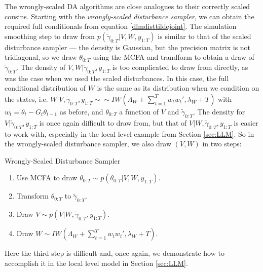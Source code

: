 \documentclass{article}
\begin{document}
The wrongly-scaled DA algorithms are close analogues to their correctly scaled cousins. Starting with the {\it wrongly-scaled disturbance sampler}, we can obtain the required full conditionals from equation \eqref{dlmdisttildejoint}. The simulation smoothing step to draw from $p(\tilde{\gamma}_{0:T}|V,W,y_{1:T})$ is similar to that of the scaled disturbance sampler --- the density is Gaussian, but the precision matrix is not tridiagonal, so we draw $\theta_{0:T}$ using the MCFA and trandform to obtain a draw of $\tilde{\gamma}_{0:T}$. The density of $V,W|\tilde{\gamma}_{0:T},y_{1:T}$ is too complicated to draw from directly, as was the case when we used the scaled disturbances. In this case, the full conditional distribution of $W$ is the same as its distribution when we condition on the states, i.e. $W|V,\tilde{\gamma}_{0:T},y_{1:T} \sim \sim IW\left(\Lambda_W + \sum_{t=1}^Tw_tw_t',\lambda_{W} + T\right)$ with $w_t = \theta_t - G_t\theta_{t-1}$ as before, and $\theta_{0:T}$ a function of $V$ and $\tilde{\gamma}_{0:T}$. The density for $V|\tilde{\gamma}_{0:T},y_{1:T}$ is once again difficult to draw from, but that of $V|W,\tilde{\gamma}_{0:T},y_{1:T}$ is easier to work with, especially in the local level example from Section \ref{sec:LLM}. So in the wrongly-scaled disturbance sampler, we also draw $(V,W)$ in two steps: 
\begin{alg*}[W-Dist]Wrongly-Scaled Disturbance Sampler\label{alg:DLMwdist}
\begin{enumerate}
\item Use MCFA to draw $\theta_{0:T} \sim p(\theta_{0:T}|V,W,y_{1:T})$.
\item Transform $\theta_{0:T}$ to $\tilde{\gamma}_{0:T}$.
\item Draw $V \sim p(V|W,\tilde{\gamma}_{0:T},y_{1:T})$.
\item Draw $W \sim IW\left(\Lambda_W + \sum_{t=1}^Tw_tw_t',\lambda_{W} + T\right)$.
\end{enumerate}
\end{alg*}
Here the third step is difficult and, once again, we demonstrate how to accomplish it in the local level model in Section \ref{sec:LLM}.
\end{document}
